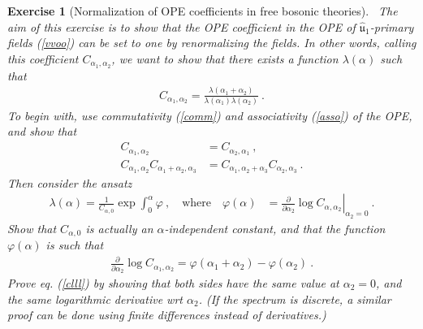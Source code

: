 \documentclass[12pt,a4paper,notitlepage]{report}
\newcommand \p {\partial}
\newcommand \pp[1] {{\frac{\p}{\p #1}}}
\numberwithin{equation}{section}
\theoremstyle{break}
\newtheorem{exo}{Exercise}[chapter]
\begin{document}
\begin{exo}[Normalization of OPE coefficients in free bosonic theories]
 ~\label{exoone}
The aim of this exercise is to show that the OPE coefficient in the OPE of $\hat{\mathfrak{u}}_1$-primary fields (\ref{vvoo}) can be set to one by renormalizing the fields. In other words, calling this coefficient $C_{\alpha_1,\alpha_2}$, we want to show that there exists a function $\lambda(\alpha)$ such that 
\begin{align}
 C_{\alpha_1,\alpha_2} = \frac{\lambda(\alpha_1+\alpha_2)}{\lambda(\alpha_1)\lambda(\alpha_2)}\ .
\label{clll}
\end{align}
To begin with, 
use commutativity (\ref{comm}) and associativity (\ref{asso}) of the OPE, and show that 
\begin{align}
C_{\alpha_1,\alpha_2} &= C_{\alpha_2,\alpha_1}\ ,
\\
 C_{\alpha_1,\alpha_2}C_{\alpha_1+\alpha_2,\alpha_3} &= C_{\alpha_1,\alpha_2+\alpha_3}C_{\alpha_2,\alpha_3}\ .
\end{align}
Then consider the ansatz
\begin{align}
  \lambda(\alpha) = \frac{1}{C_{\alpha,0}} \exp \int_0^{\alpha} \varphi \ , \quad \text{where}\quad  
 \varphi(\alpha)&=\left.\pp{\alpha_2}\log C_{\alpha,\alpha_2}\right|_{\alpha_2=0}\ .
\end{align}
Show that $C_{\alpha,0}$ is actually an $\alpha$-independent constant, and that the function $\varphi(\alpha)$ is such that
\begin{align}
 \pp{\alpha_2} \log C_{\alpha_1,\alpha_2}  = \varphi(\alpha_1+\alpha_2)-\varphi(\alpha_2)\ . 
\end{align}
Prove eq. (\ref{clll}) by showing that both sides have the same value at $\alpha_2=0$, and the same logarithmic derivative wrt $\alpha_2$. 
(If the spectrum is discrete, a similar proof can be done using finite differences instead of derivatives.) 
\end{exo}
\end{document}
